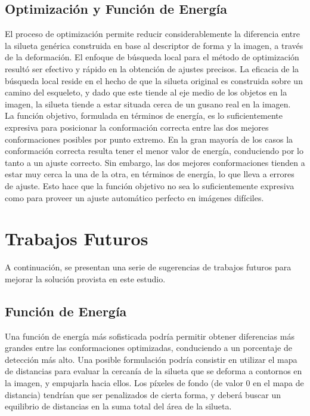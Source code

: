 \subsection*{Optimizaci\'on y Funci\'on de Energ\'ia}

El proceso de optimizaci\'on permite reducir considerablemente la diferencia
entre la silueta gen\'erica construida en base al descriptor de forma y 
la imagen, a trav\'es de la deformaci\'on.
El enfoque de b\'usqueda local para el m\'etodo de optimizaci\'on 
result\'o ser efectivo y r\'apido en la obtenci\'on de ajustes precisos.
La eficacia de la b\'usqueda local reside en el hecho de que la silueta
original es construida sobre un camino del esqueleto, y dado que este
tiende al eje medio de los objetos en la imagen, la silueta tiende a 
estar situada cerca de un gusano real en la imagen.\\

La funci\'on objetivo, formulada en t\'erminos de energ\'ia, es lo 
suficientemente expresiva para posicionar la conformaci\'on correcta
entre las dos mejores conformaciones posibles por punto extremo. En
la gran mayor\'ia de los casos la conformaci\'on correcta resulta
tener el menor valor de energ\'ia, conduciendo por lo tanto a un ajuste correcto.
Sin embargo, las dos mejores conformaciones tienden a estar muy cerca la una de la otra,
en t\'erminos de energ\'ia, lo que lleva a errores de ajuste. Esto hace que
la funci\'on objetivo no sea lo suficientemente expresiva como para proveer
un ajuste autom\'atico perfecto en im\'agenes dif\'iciles.

\section{Trabajos Futuros}

A continuaci\'on, se presentan una serie de sugerencias de trabajos
futuros para mejorar la soluci\'on provista en este estudio.

\subsection*{Funci\'on de Energ\'ia}

Una funci\'on de energ\'ia m\'as sofisticada podr\'ia permitir obtener diferencias
m\'as grandes entre las conformaciones optimizadas, conduciendo a un porcentaje
de detecci\'on m\'as alto. Una posible formulaci\'on podr\'ia consistir en utilizar
el mapa de distancias para evaluar la cercan\'ia de la silueta que se deforma
a contornos en la imagen, y empujarla hacia ellos. Los p\'ixeles de fondo
(de valor $0$ en el mapa de distancia) tendr\'ian que ser penalizados de cierta
forma, y deber\'a buscar un equilibrio de distancias en la suma total del \'area
de la silueta.

